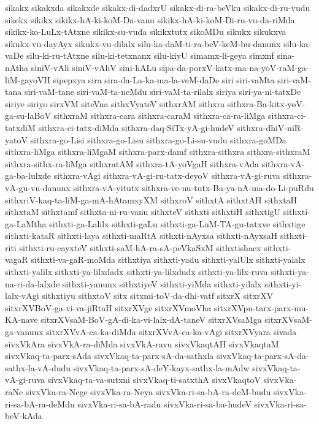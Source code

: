 {sikakx
sikakxda
sikakxde
sikakx-di-dadxrU
sikakx-di-ra-beVku
sikakx-di-ru-vudu
sikekx
sikikx
sikikx-hA-ki-koM-Da-vanu
sikikx-hA-ki-koM-Di-ru-vu-da-riMda
sikikx-ko-LuLx-tAtxne
sikikx-su-vuda
sikikxtutx
sikoMDu
sikukx
sikukxva
sikukx-vu-dayAyx
sikukx-vu-dilalx
silu-ka-daM-ti-ra-beV-keM-bu-danunx
silu-ka-vaDe
silu-ki-ru-tAtxne
silu-ki-tetxnanx
silu-kiyU
simamx-li-geya
simxnf
sina-nAtha
siniV-vAli
siniV-vAliV
sini-hALu
sipa-da-porxV-katx-ma-na-yoV-raM-ga-liM-gayoVH
sipepxya
sira
sira-da-La-ka-ma-la-veM-daDe
siri
siri-vaMta
siri-vaM-tana
siri-vaM-tane
siri-vaM-ta-neMdu
siri-vaM-ta-rilalx
siriya
siri-ya-ni-tatxDe
siriye
siriyo
sirxVM
siteVna
sithxVyateV
sithxrAM
sithxra
sithxra-Ba-kitx-yoV-ga-su-laBoV
sithxraM
sithxra-cara
sithxra-caraM
sithxra-ca-ra-liMga
sithxra-ci-tatxdiM
sithxra-ci-tatx-diMda
sithxra-daq-SiTx-yA-gi-hudeV
sithxra-dhiV-niR-yatoV
sithxra-go-Lisi
sithxra-go-Lisu
sithxra-go-Li-su-vudu
sithxra-goMDa
sithxra-liMga
sithxra-liMgaM
sithxra-parx-damf
sithxra-sithxra
sithxra-sithxraM
sithxra-sithx-ra-liMga
sithxratAM
sithxra-tA-yoVgaH
sithxra-vAda
sithxra-vA-ga-ba-lulxde
sithxra-vAgi
sithxra-vA-gi-ru-tatx-deyoV
sithxra-vA-gi-ruva
sithxra-vA-gu-vu-danunx
sithxra-vA-yitutx
sithxra-ve-nu-tutx-Ba-ya-nA-ma-do-Li-puRdu
sithxriV-kaq-ta-liM-ga-mA-hAtamxyXM
sithxroV
sithxtA
sithxtAH
sithxtaH
sithxtaM
sithxtamf
sithxta-ni-ru-vanu
sithxteV
sithxti
sithxtiH
sithxtigU
sithxti-ga-LaMtha
sithxti-ga-Lalilx
sithxti-gaLu
sithxti-ga-LuM-TA-gu-tatxve
sithxtige
sithxti-kataR
sithxti-laya
sithxti-maRtA
sithxti-nAyxsa
sithxti-nAyxsaH
sithxti-riti
sithxti-ru-cayxteV
sithxti-saM-hA-ra-sA-peVkaSxM
sithxtishacx
sithxti-vagaR
sithxti-va-gaR-moMda
sithxtiya
sithxti-yadu
sithxti-yalUlx
sithxti-yalalx
sithxti-yalilx
sithxti-ya-lilxdadx
sithxti-ya-lilxdudx
sithxti-ya-lilx-ruva
sithxti-ya-na-ri-da-lalxde
sithxti-yanunx
sithxtiyeV
sithxti-yiMda
sithxti-yilalx
sithxti-yi-lalx-vAgi
sithxtiyu
sithxtoV
sitx
sitxmi-toV-da-dhi-vatf
sitxrX
sitxrXV
sitxrXVBoV-ga-vi-va-jiRtaH
sitxrXVge
sitxrXVmoVha
sitxrXVpu-tarx-parx-mu-KA-nave
sitxrXVsaM-BoV-gA-di-ka-vi-lalx-dA-taneV
sitxrXVsaMga
sitxrXVsaM-ga-vanunx
sitxrXVvA-ca-ka-diMda
sitxrXVvA-ca-ka-vAgi
sitxrXVyara
sivada
sivxVkAra
sivxVkA-ra-diMda
sivxVkA-ravu
sivxVkaqtAH
sivxVkaqtaM
sivxVkaq-ta-parx-sAda
sivxVkaq-ta-parx-sA-da-sathxla
sivxVkaq-ta-parx-sA-da-sathx-la-vA-dudu
sivxVkaq-ta-parx-sA-deY-kayx-sathx-la-mAdw
sivxVkaq-ta-vA-gi-ruva
sivxVkaq-ta-va-sutxni
sivxVkaq-ti-satxthA
sivxVkaqtoV
sivxVka-raNe
sivxVka-ra-Nege
sivxVka-ra-Neya
sivxVka-ri-sa-bA-ra-deM-budu
sivxVka-ri-sa-bA-ra-deMdu
sivxVka-ri-sa-bA-radu
sivxVka-ri-sa-ba-hudeV
sivxVka-ri-sa-beV-kAda
}
